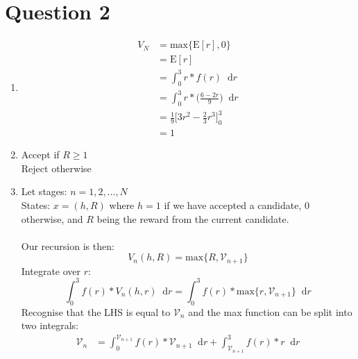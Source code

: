 \documentclass[10pt,a4paper]{article}
\newcommand*\diff{\mathop{}\!\mathrm{d}}
\begin{document}
\section*{Question 2}
\begin{enumerate}
	\item \begin{align*}
	V_N &= \text{max}\{\text{E}[r], 0\} \\
	&= \text{E}[r] \\
	&= \int^3_0 r * f(r) \diff r \\
	&= \int^3_0 r * \bigg(\frac{6-2r}{9}\bigg) \diff r \\
	&= \frac{1}{9} \bigg[3r^2-\frac{2}{3}r^3\bigg]^3_0 \\
	&= 1
	\end{align*}
	
	\item Accept if \(R \geq 1\) \\
	Reject otherwise
	
	\item Let stages: \(n = 1, 2, \dots, N\) \\
	States: \(x = (h, R)\) where \(h = 1\) if we have accepted a candidate, 0 otherwise, and \(R\) being the reward from the current candidate. \\ \\
	Our recursion is then:
	\begin{equation*}
	V_n(h, R) = \text{max}\{R, \mathcal{V}_{n+1}\}
	\end{equation*}
	Integrate over \(r\):
	\begin{equation*}
	\int^3_0 f(r) * V_n(h, r) \diff r = \int^3_0 f(r) * \text{max}\{r, \mathcal{V}_{n+1}\} \diff r
	\end{equation*}
	Recognise that the LHS is equal to \(\mathcal{V}_n\) and the max function can be split into two integrals:
	\begin{align*}
	\mathcal{V}_n &= \int^{\mathcal{V}_{n+1}}_0 f(r) * \mathcal{V}_{n+1} \diff r
	+ \int^3_{\mathcal{V}_{n+1}} f(r) * r \diff r
	\end{align*}
\end{enumerate}	
	
\end{document}
